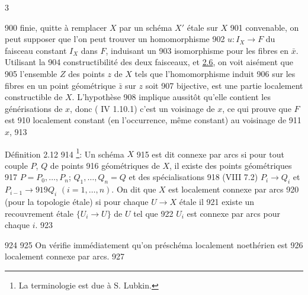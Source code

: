 3	\documentclass[10pt]{../fichiers-configuration-latex/smfart}
\begin{document}
   900	finie, quitte à remplacer $X$ par un schéma $X'$ étale sur $X$
   901	convenable, on peut supposer que l'on peut trouver un homomorphisme
   902	$u:I_X\rightarrow F$ du faisceau constant $I_X$ dans $F$, induisant un
   903	isomorphisme pour les fibres en $\bar{x}$. Utilisant la
   904	constructibilité des deux faisceaux, et \hyperref[IX.prop2.6]{2.6}, on voit aisément que
   905	l'ensemble $Z$ des points $z$ de $X$ tels que l'homomorphisme induit
   906	sur les fibres en un point géométrique $\bar{z}$ sur $z$ soit
   907	bijective, est une partie localement constructible de $X$. L'hypothèse
   908	implique aussitôt qu'elle contient les générisations de $x$, donc (	IV 1.10.1) c'est un voisinage de $x$, ce qui prouve que $F$ est
   910	localement constant (en l'occurrence, même constant) au voisinage de
   911	$x$,	
   913	\begin{enonce*}{Définition 2.12}
   914	\footnote[1]{La terminologie est due à S. Lubkin.}: Un schéma $X$
   915	est dit connexe par arcs si pour tout couple $P$, $Q$ de points
   916	géométriques de $X$, il existe des points géométriques
   917	$P=P_0,\ldots,P_n$; $Q_1,\ldots,Q_n=Q$ et des spécialisations {\rm
   918	(VIII 7.2)} $P_i\rightarrow Q_i$ et $P_{i-1}\rightarrow
   919	Q_i$ $(i=1,\ldots,n)$. On dit que $X$ est localement connexe par arcs
   920	(pour la topologie étale) si pour chaque $U\rightarrow X$ étale il
   921	existe un recouvrement étale $\{U_i\rightarrow U\}$ de $U$ tel que
   922	$U_i$ est connexe par arcs pour chaque $i$.
   923	\end{enonce*}
   924	
   925	On vérifie immédiatement qu'on préschéma localement noethérien est
   926	localement connexe par arcs.
   927	
\end{document}
